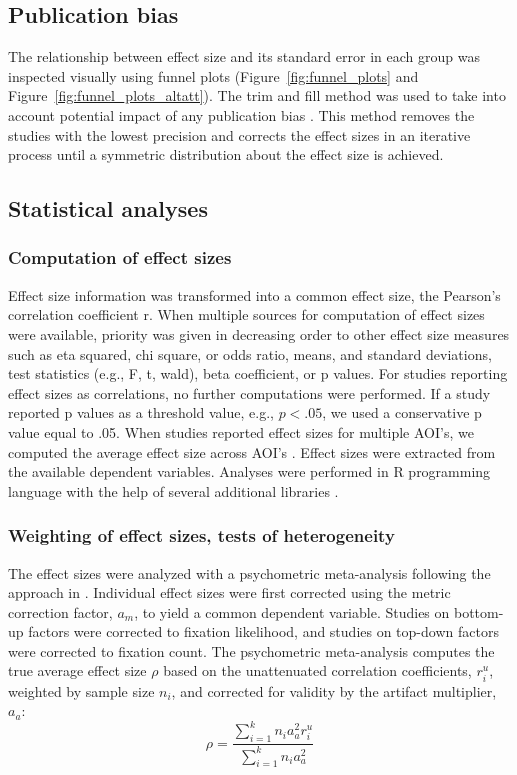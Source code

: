 \documentclass{article}
\begin{document}
\subsection{Publication bias}

The relationship between effect size and its standard error in each group was inspected visually using funnel plots (Figure~\ref{fig:funnel_plots} and Figure~\ref{fig:funnel_plots_altatt}). The trim and fill method was used to take into account potential impact of any publication bias \citep{duval2000trim}. This method removes the studies with the lowest precision and corrects the effect sizes in an iterative process until a symmetric distribution about the effect size is achieved.


\subsection{Statistical analyses}

\subsubsection{Computation of effect sizes}

Effect size information was transformed into a common effect size, the Pearson’s correlation coefficient r. When multiple sources for computation of effect sizes were available, priority was given in decreasing order to other effect size measures such as eta squared, chi square, or odds ratio, means, and standard deviations, test statistics (e.g., F, t, wald), beta coefficient, or p values. For studies reporting effect sizes as correlations, no further computations were performed. If a study reported p values as a threshold value, e.g., $p < .05$, we used a conservative p value equal to .05. When studies reported effect sizes for multiple AOI's, we computed the average effect size across AOI's \citep[for a similar approach, see][]{chita2016attention}. Effect sizes were extracted from the available dependent variables. Analyses were performed in R programming language with the help of several additional libraries \citep{R2020,del2012a,datatable,ggplot2,metafor}.


\subsubsection{Weighting of effect sizes, tests of heterogeneity}

The effect sizes were analyzed with a psychometric meta-analysis following the approach in \cite{hunter2004a}. Individual effect sizes were first corrected using the metric correction factor, $a_m$, to yield a common dependent variable. Studies on bottom-up factors were corrected to fixation likelihood, and studies on top-down factors were corrected to fixation count. The psychometric meta-analysis computes the true average effect size $\rho$ based on the unattenuated correlation coefficients, $r_i^u$, weighted by sample size $n_i$, and corrected for validity by the artifact multiplier, $a_a$: 
%
\begin{equation}
\label{eq:psychometric_rho}
\rho = \frac{\sum_{i=1}^k n_i a_a^2 r_i^u}{\sum_{i=1}^k n_i a_a^2}
\end{equation}
\end{document}
